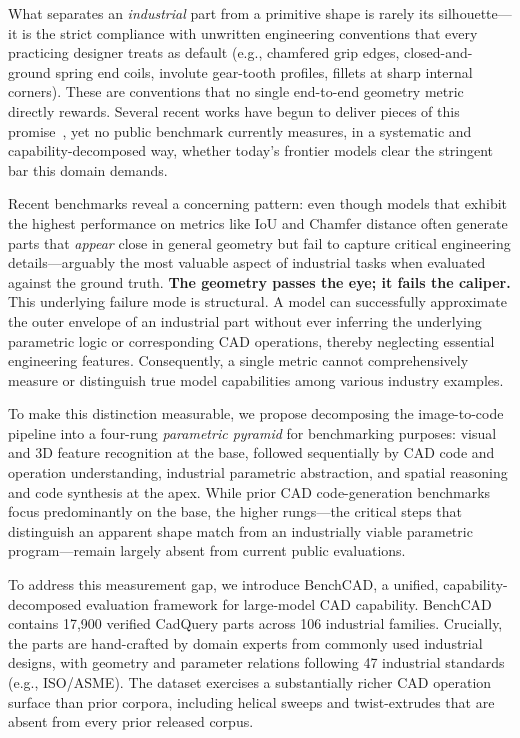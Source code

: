 What separates an \emph{industrial} part from a primitive shape is rarely its silhouette---it is the strict compliance with unwritten engineering conventions that every practicing designer treats as default (e.g., chamfered grip edges, closed-and-ground spring end coils, involute gear-tooth profiles, fillets at sharp internal corners). These are conventions that no single end-to-end geometry metric directly rewards.
Several recent works have begun to deliver pieces of this promise~\citep{Khan2024,Guan2025,Rukhovich2025,Alrashedy2025,Kolodiazhnyi2026}, yet no public benchmark currently measures, in a systematic and capability-decomposed way, whether today's frontier models clear the stringent bar this domain demands. 

Recent benchmarks reveal a concerning pattern: even though models that exhibit the highest performance on metrics like IoU and Chamfer distance often generate parts that \emph{appear} close in general geometry but fail to capture critical engineering details—arguably the most valuable aspect of industrial tasks when evaluated against the ground truth. 
\textbf{The geometry passes the eye; it fails the caliper.} This underlying failure mode is structural. 
A model can successfully approximate the outer envelope of an industrial part without ever inferring the underlying parametric logic or corresponding CAD operations, thereby neglecting essential engineering features. 
Consequently, a single metric cannot comprehensively measure or distinguish true model capabilities among various industry examples.

To make this distinction measurable, we propose decomposing the image-to-code pipeline into a four-rung \emph{parametric pyramid} for benchmarking purposes: 
visual and 3D feature recognition at the base, followed sequentially by CAD code and operation understanding, industrial parametric abstraction, and spatial reasoning and code synthesis at the apex. 
While prior CAD code-generation benchmarks focus predominantly on the base, the higher rungs—the critical steps that distinguish an apparent shape match from an industrially viable parametric program—remain largely absent from current public evaluations.

To address this measurement gap, we introduce BenchCAD, a unified, capability-decomposed evaluation framework for large-model CAD capability. BenchCAD contains 17{,}900 verified CadQuery parts across 106 industrial families.
Crucially, the parts are hand-crafted by domain experts from commonly used industrial designs, with geometry and parameter relations following 47 industrial standards (e.g., ISO/ASME). The dataset exercises a substantially richer CAD operation surface than prior corpora, including helical sweeps and twist-extrudes that are absent from every prior released corpus.

